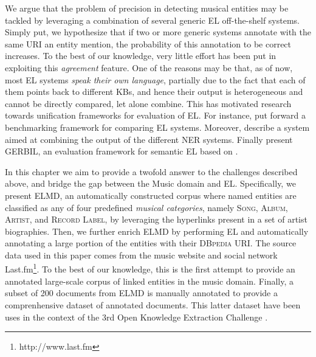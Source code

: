 We argue that the problem of precision in detecting musical entities may be tackled by leveraging a combination of several generic EL off-the-shelf systems. Simply put, we hypothesize that if two or more generic systems annotate with the same URI an entity mention, the probability of this annotation to be correct increases. To the best of our knowledge, very little effort has been put in exploiting this \textit{agreement} feature. One of the reasons may be that, as of now, most EL systems \textit{speak their own language}, partially due to the fact that each of them points back to different KBs, and hence their output is heterogeneous and cannot be directly compared, let alone combine. This has motivated research towards unification frameworks for evaluation of EL. For instance, \cite{Cornolti2013} put forward a benchmarking framework for comparing EL systems. Moreover, \cite{Rizzo2014} describe a system aimed at combining the output of the different NER systems. Finally \cite{Usbeck2015} present \textsc{GERBIL}, an evaluation framework for semantic EL based on \cite{Cornolti2013}. %


In this chapter we aim to provide a twofold answer to the challenges described above, and bridge the gap between the Music domain and EL. Specifically, we present \textsc{ELMD}, an automatically constructed corpus where named entities are classified as any of four predefined \textit{musical categories}, namely \textsc{Song}, \textsc{Album}, \textsc{Artist}, and \textsc{Record Label}, by leveraging the hyperlinks present in a set of artist biographies. Then, we further enrich \textsc{ELMD} by performing EL and automatically annotating a large portion of the entities with their \textsc{DBpedia} URI. The source data used in this paper comes from the music website and social network Last.fm\footnote{http://www.last.fm}. To the best of our knowledge, this is the first attempt to provide an annotated large-scale 
corpus of linked entities in the music domain. %
Finally, a subset of 200 documents from ELMD is manually annotated to provide a comprenhensive dataset of annotated documents. This latter dataset have been uses in the context of the 3rd Open Knowledge Extraction Challenge \cite{TODO}.

